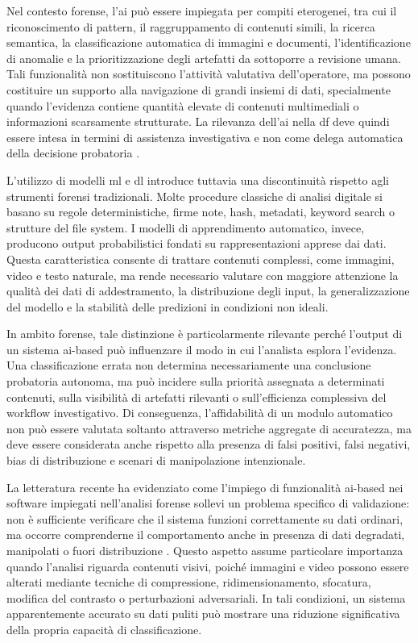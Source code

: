 Nel contesto forense, l'\gls{ai} può essere impiegata per compiti eterogenei, tra cui il riconoscimento di pattern, il raggruppamento di contenuti simili, la ricerca semantica, la classificazione automatica di immagini e documenti, l'identificazione di anomalie e la prioritizzazione degli artefatti da sottoporre a revisione umana. Tali funzionalità non sostituiscono l'attività valutativa dell'operatore, ma possono costituire un supporto alla navigazione di grandi insiemi di dati, specialmente quando l'evidenza contiene quantità elevate di contenuti multimediali o informazioni scarsamente strutturate. La rilevanza dell'\gls{ai} nella \gls{df} deve quindi essere intesa in termini di assistenza investigativa e non come delega automatica della decisione probatoria \cite{costantini2019digital,faqir2023digital}.

L'utilizzo di modelli \gls{ml} e \gls{dl} introduce tuttavia una discontinuità rispetto agli strumenti forensi tradizionali. Molte procedure classiche di analisi digitale si basano su regole deterministiche, firme note, hash, metadati, keyword search o strutture del file system. I modelli di apprendimento automatico, invece, producono output probabilistici fondati su rappresentazioni apprese dai dati. Questa caratteristica consente di trattare contenuti complessi, come immagini, video e testo naturale, ma rende necessario valutare con maggiore attenzione la qualità dei dati di addestramento, la distribuzione degli input, la generalizzazione del modello e la stabilità delle predizioni in condizioni non ideali.

In ambito forense, tale distinzione è particolarmente rilevante perché l'output di un sistema \gls{ai}-based può influenzare il modo in cui l'analista esplora l'evidenza. Una classificazione errata non determina necessariamente una conclusione probatoria autonoma, ma può incidere sulla priorità assegnata a determinati contenuti, sulla visibilità di artefatti rilevanti o sull'efficienza complessiva del workflow investigativo. Di conseguenza, l'affidabilità di un modulo automatico non può essere valutata soltanto attraverso metriche aggregate di accuratezza, ma deve essere considerata anche rispetto alla presenza di falsi positivi, falsi negativi, bias di distribuzione e scenari di manipolazione intenzionale.

La letteratura recente ha evidenziato come l'impiego di funzionalità \gls{ai}-based nei software impiegati nell'analisi forense sollevi un problema specifico di validazione: non è sufficiente verificare che il sistema funzioni correttamente su dati ordinari, ma occorre comprenderne il comportamento anche in presenza di dati degradati, manipolati o fuori distribuzione \cite{sanna2024preliminary,sanna2025pixelperfect}. Questo aspetto assume particolare importanza quando l'analisi riguarda contenuti visivi, poiché immagini e video possono essere alterati mediante tecniche di compressione, ridimensionamento, sfocatura, modifica del contrasto o perturbazioni adversariali. In tali condizioni, un sistema apparentemente accurato su dati puliti può mostrare una riduzione significativa della propria capacità di classificazione.

